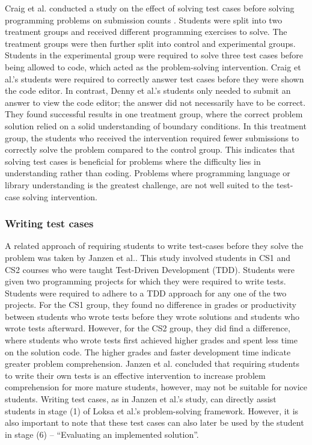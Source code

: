 \documentclass[sigconf,authorversion,nonacm]{acmart}
\begin{document}
Craig et al. conducted a study on the effect of solving test cases before solving programming problems on submission counts \cite{craig2019}. Students were split into two treatment groups and received different programming exercises to solve. The treatment groups were then further split into control and experimental groups. Students in the experimental group were required to solve three test cases before being allowed to code, which acted as the problem-solving intervention. Craig et al.’s students were required to correctly answer test cases before they were shown the code editor. In contrast, Denny et al.’s students only needed to submit an answer to view the code editor; the answer did not necessarily have to be correct. They found successful results in one treatment group, where the correct problem solution relied on a solid understanding of boundary conditions. In this treatment group, the students who received the intervention required fewer submissions to correctly solve the problem compared to the control group. This indicates that solving test cases is beneficial for problems where the difficulty lies in understanding rather than coding. Problems where programming language or library understanding is the greatest challenge, are not well suited to the test-case solving intervention.

\subsubsection{Writing test cases}
A related approach of requiring students to write test-cases before they solve the problem was taken by Janzen et al.\cite{janzen2008}. This study involved students in CS1 and CS2 courses who were taught Test-Driven Development (TDD). Students were given two programming projects for which they were required to write tests. Students were required to adhere to a TDD approach for any one of the two projects. For the CS1 group, they found no difference in grades or productivity between students who wrote tests before they wrote solutions and students who wrote tests afterward. However, for the CS2 group, they did find a difference, where students who wrote tests first achieved higher grades and spent less time on the solution code. The higher grades and faster development time indicate greater problem comprehension. Janzen et al. concluded that requiring students to write their own tests is an effective intervention to increase problem comprehension for more mature students, however, may not be suitable for novice students.
Writing test cases, as in Janzen et al.’s study, can directly assist students in stage (1) of Loksa et al.’s problem-solving framework. However, it is also important to note that these test cases can also later be used by the student in stage (6) – “Evaluating an implemented solution”.
\end{document}
